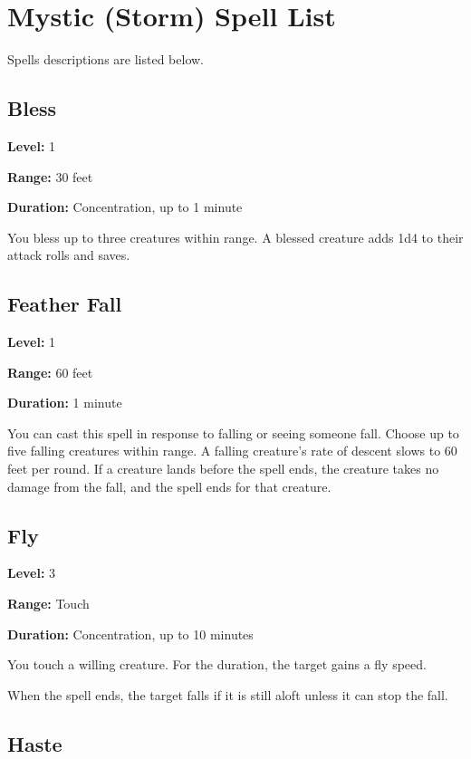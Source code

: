 \documentclass[12pt,letterpaper,twocolumn,openany,nodeprecatedcode,bg=none]{dndbook}
\let\oldsubsection\subsection
\renewcommand{\subsection}[1]{%
  \needspace{5\baselineskip}%
  \oldsubsection{#1}%
}
\begin{document}
\section{Mystic (Storm) Spell List}\label{mystic-storm-spell-list}

Spells descriptions are listed below.

\subsection{Bless}\label{bless}

\textbf{Level:} 1

\textbf{Range:} 30 feet

\textbf{Duration:} Concentration, up to 1 minute

You bless up to three creatures within range. A blessed creature adds
1d4 to their attack rolls and saves.

\subsection{Feather Fall}\label{feather-fall}

\textbf{Level:} 1

\textbf{Range:} 60 feet

\textbf{Duration:} 1 minute

You can cast this spell in response to falling or seeing someone fall.
Choose up to five falling creatures within range. A falling creature's
rate of descent slows to 60 feet per round. If a creature lands before
the spell ends, the creature takes no damage from the fall, and the
spell ends for that creature.

\subsection{Fly}\label{fly}

\textbf{Level:} 3

\textbf{Range:} Touch

\textbf{Duration:} Concentration, up to 10 minutes

You touch a willing creature. For the duration, the target gains a fly
speed.

When the spell ends, the target falls if it is still aloft unless it can
stop the fall.

\subsection{Haste}\label{haste}
\end{document}
